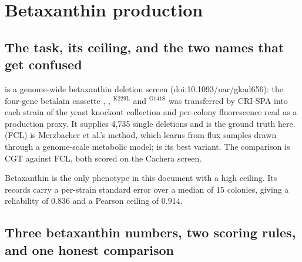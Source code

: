 
\section{Betaxanthin production}
\label{sec:betaxanthin}

\subsection{The task, its ceiling, and the two names that get confused}

 is a genome-wide betaxanthin deletion screen
(doi:10.1093/nar/gkad656): the four-gene betalain cassette , ,
$^{\mathrm{K229L}}$ and $^{\mathrm{G141S}}$ was transferred by CRI-SPA
into each strain of the yeast knockout collection and per-colony fluorescence read as a
production proxy. It supplies 4,735 single deletions and is the ground truth here.
 (FCL) is Merzbacher et al.'s method, which learns from flux
samples drawn through a genome-scale metabolic model;
 is its best variant. The comparison is CGT
against FCL, both scored on the Cachera screen.

Betaxanthin is the only phenotype in this document with a high ceiling. Its records carry a
per-strain standard error over a median of 15 colonies, giving a reliability of $0.836$ and
a Pearson ceiling of $\mathbf{0.914}$.


\subsection{Three betaxanthin numbers, two scoring rules, and one honest comparison}
\label{sec:bx-two-numbers}

